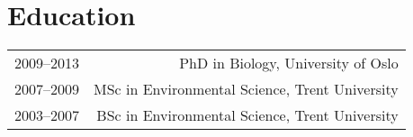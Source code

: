\section*{Education}

\begin{tabular}{L!{\VRule}R}  
2009--2013 & PhD in Biology, University of Oslo\\
2007--2009 & MSc in Environmental Science, Trent University \\
2003--2007 & BSc in Environmental Science, Trent University \\
\end{tabular}
